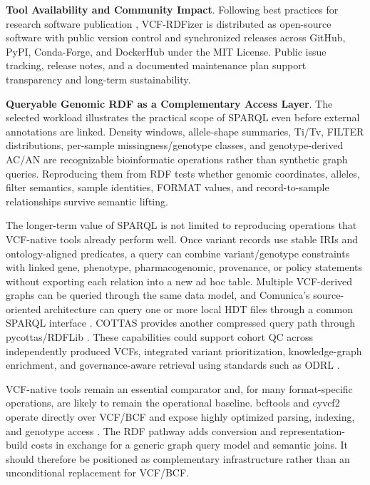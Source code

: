 \documentclass[pdflatex,sn-mathphys-num]{sn-jnl}%
\newenvironment{revision}{\begingroup\color{revisionblue}}{\endgroup}%
\theoremstyle{thmstyleone}%
\theoremstyle{thmstyletwo}%
\theoremstyle{thmstylethree}%
\begin{document}
\textbf{Tool Availability and Community Impact}.
Following best practices for research software publication \cite{jimenez_2017_f1000}, VCF-RDFizer is distributed as open-source software with public version control and synchronized releases across GitHub, PyPI, Conda-Forge, and DockerHub under the MIT License. 
Public issue tracking, release notes, and a documented maintenance plan support transparency and long-term sustainability.


\begin{revision}
\textbf{Queryable Genomic RDF as a Complementary Access Layer}.
The selected workload illustrates the practical scope of SPARQL even before external annotations are linked. Density windows, allele-shape summaries, Ti/Tv, FILTER distributions, per-sample missingness/genotype classes, and genotype-derived AC/AN are recognizable bioinformatic operations rather than synthetic graph queries. Reproducing them from RDF tests whether genomic coordinates, alleles, filter semantics, sample identities, FORMAT values, and record-to-sample relationships survive semantic lifting.

The longer-term value of SPARQL is not limited to reproducing operations that VCF-native tools already perform well. Once variant records use stable IRIs and ontology-aligned predicates, a query can combine variant/genotype constraints with linked gene, phenotype, pharmacogenomic, provenance, or policy statements without exporting each relation into a new ad hoc table. Multiple VCF-derived graphs can be queried through the same data model, and Comunica's source-oriented architecture can query one or more local HDT files through a common SPARQL interface \cite{Taelman2018Comunica,comunica_hdt_docs_2026}. COTTAS provides another compressed query path through pycottas/RDFLib \cite{cottas_2025,pycottas_2026}. These capabilities could support cohort QC across independently produced VCFs, integrated variant prioritization, knowledge-graph enrichment, and governance-aware retrieval using standards such as ODRL \cite{odrl_2018}.

VCF-native tools remain an essential comparator and, for many format-specific operations, are likely to remain the operational baseline. bcftools and cyvcf2 operate directly over VCF/BCF and expose highly optimized parsing, indexing, and genotype access \cite{BCFtools,cyvcf2_2017}. The RDF pathway adds conversion and representation-build costs in exchange for a generic graph query model and semantic joins. It should therefore be positioned as complementary infrastructure rather than an unconditional replacement for VCF/BCF.


\end{revision}
\end{document}
